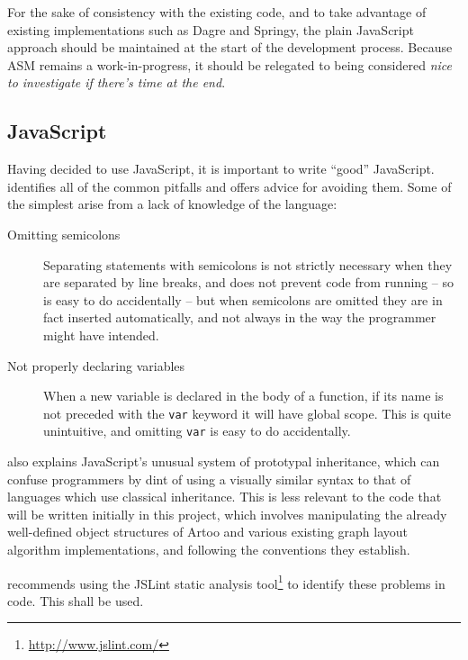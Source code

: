 For the sake of consistency with the existing code, and to take advantage of existing implementations such as Dagre and Springy, the plain JavaScript approach should be maintained at the start of the development process. Because ASM remains a work-in-progress, it should be relegated to being considered \emph{nice to investigate if there's time at the end}.

\subsection{JavaScript}

Having decided to use JavaScript, it is important to write ``good'' JavaScript. 
\citet{Crockford:2008:JGP:1386753} identifies all of the common pitfalls and offers advice for avoiding them.
Some of the simplest arise from a lack of knowledge of the language: 

\begin{description}
    \item[Omitting semicolons]
    Separating statements with semicolons is not strictly necessary when they are separated by line breaks, and does not prevent code from running -- so is easy to do accidentally -- but when semicolons are omitted they are in fact inserted automatically, and not always in the way the programmer might have intended.
    \item[Not properly declaring variables]
    When a new variable is declared in the body of a function, if its name is not preceded with the \texttt{var} keyword it will have global scope. This is quite unintuitive, and omitting \texttt{var} is easy to do accidentally.
\end{description}

\citeauthor{Crockford:2008:JGP:1386753} also explains JavaScript's unusual system of prototypal inheritance, which can confuse programmers by dint of using a visually similar syntax to that of languages which use classical inheritance. This is less relevant to the code that will be written initially in this project, which involves manipulating the already well-defined object structures of Artoo and various existing graph layout algorithm implementations, and following the conventions they establish.

\citeauthor{Crockford:2008:JGP:1386753} recommends using the JSLint static analysis tool\footnote{\url{http://www.jslint.com/}} to identify these problems in code. This shall be used.

